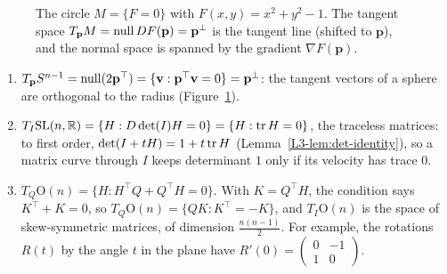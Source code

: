 \begin{figure}[ht]
    \centering
    \caption{The circle $M = \{F = 0\}$ with $F(x, y) = x^2 + y^2 - 1$. The tangent space $T_{\mathbf{p}}M = \operatorname{null} DF(\mathbf{p}) = \mathbf{p}^\perp$ is the tangent line (shifted to $\mathbf{p}$), and the normal space is spanned by the gradient $\nabla F(\mathbf{p})$.}
    \label{A-fig:tangent}
\end{figure}

\begin{example}\label{A-ex:tangent-spaces}
    \begin{enumerate}
        \item $T_{\mathbf{p}}S^{n-1} = \operatorname{null}(2\mathbf{p}^\top) = \{\mathbf{v} : \mathbf{p}^\top\mathbf{v} = 0\} = \mathbf{p}^\perp$: the tangent vectors of a sphere are orthogonal to the radius (Figure~\ref{A-fig:tangent}).
        \item $T_I \mathrm{SL}(n, \mathbb{R}) = \{H : D\det(I)H = 0\} = \{H : \operatorname{tr} H = 0\}$, the traceless matrices: to first order, $\det(I + tH) = 1 + t\operatorname{tr} H$ (Lemma~\ref{L3-lem:det-identity}), so a matrix curve through $I$ keeps determinant $1$ only if its velocity has trace $0$.
        \item $T_Q \mathrm{O}(n) = \{H : H^\top Q + Q^\top H = 0\}$. With $K = Q^\top H$, the condition says $K^\top + K = 0$, so $T_Q \mathrm{O}(n) = \{QK : K^\top = -K\}$, and $T_I \mathrm{O}(n)$ is the space of skew-symmetric matrices, of dimension $\frac{n(n-1)}{2}$. For example, the rotations $R(t)$ by the angle $t$ in the plane have $R'(0) = \begin{pmatrix} 0 & -1 \\ 1 & 0 \end{pmatrix}$.
    \end{enumerate}
\end{example}

